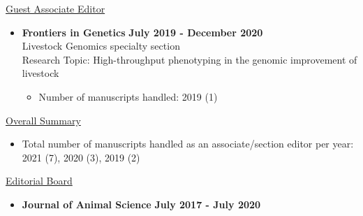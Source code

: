 \documentclass[margin,line,10pt]{res}
\begin{document}
\begin{resume}
\vspace{0.3cm}

\underline{Guest Associate Editor}
\vspace{0.2cm}
\begin{itemize}
\item {\bf Frontiers in Genetics} \hfill  {\bf July 2019 - December 2020} \\
  Livestock Genomics specialty section \\
  Research Topic: High-throughput phenotyping in the genomic improvement of livestock
  \begin{itemize}
    \item Number of manuscripts handled: 2019 (1)
  \end{itemize}
\end{itemize}
\vspace{0.3cm}


\underline{Overall Summary}
 \vspace{.2cm}
\begin{itemize}
\item Total number of manuscripts handled as an associate/section editor per year: 2021 (7), 2020 (3), 2019 (2) 
\end{itemize}


\vspace{0.3cm}


\underline{Editorial Board}
 \vspace{.2cm}
\begin{itemize}
\item {\bf Journal of Animal Science} \hfill  {\bf July 2017 - July 2020} 
\end{itemize}






\end{resume}
\end{document}
